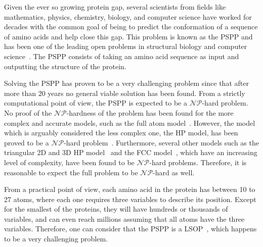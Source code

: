 Given the ever so growing protein gap, several scientists from fields like
mathematics, physics, chemistry, biology, and computer science have worked for
decades with the common goal of being to predict the conformation of a sequence
of amino acids and help close this gap. This problem is known as the
\ac{PSPP} and has been one of the leading open problems
in structural biology and computer science~\cite{dorn2014three}.
The \ac{PSPP} consists of
taking an amino acid sequence as input and outputting the structure of the
protein.

Solving the \ac{PSPP} has proven to be a very challenging problem since that after more than 20 years no general viable
solution has been found. From a strictly computational point of view, the \ac{PSPP} is expected to be a $\mathcal{NP}$-hard problem. No proof of the $\mathcal{NP}$-hardness of the problem has been found for the more complex and accurate models, such as the full atom model~\cite{rohl2004protein}. However, the model which is arguably considered the less complex one, the \ac{HP} model, has been proved to be a $\mathcal{NP}$-hard problem~\cite{berger1998protein}. Furthermore, several other models such as the triangular 2D and 3D \ac{HP}
model~\cite{agarwala1997local} and the \ac{FCC} model~\cite{hoque2007protein},
which have an increasing level of complexity, have been found to be $\mathcal{NP}$-hard problems.
Therefore, it is reasonable to expect the full problem to be $\mathcal{NP}$-hard as well.

From a practical point of view, each amino acid in the protein has between 10
to 27 atoms, where each one requires three variables to describe its position.
Except for the smallest of the proteins, they will have hundreds or thousands
of variables, and can even reach millions assuming that all atoms have the
three variables. Therefore, one can consider that the \ac{PSPP} is a
\ac{LSOP}~\cite{mahdavi2015metaheuristics}, which happens to be a very challenging problem.

